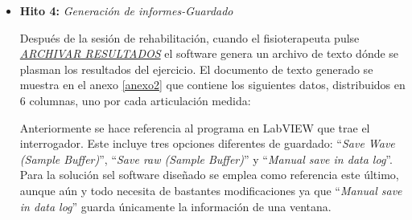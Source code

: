 \begin{itemize} [label=]
\begin{itemize} [label=]
		\item \underline{\textit{Bloque de visualización: }} El bloque de visualización está compuesto por dos ventanas: los indicadores del movimiento y la gráfica del espectro. Este último se utiliza como visualizador del comportamiento de las FBGs. Permite identificar en un rapido vistazo si el programa está funcionando correctamente. %
		
		Los indicadores del movimiento consisten en seis deslizadores, uno por cada FBG. Los indicadores están programados para que durante el paso de medición muestren entre el valor de reposo y el de los máximos de extensión y flexión en que posición se encuentra cada dedo (y muñeca). Cada uno de los dedos tiene su propio rango de movimiento.  
		
		Como se observa en la figura \ref{fig:interfazinicio} cada indicador tiene un rango que va desde el porcentaje de -120 hasta 120. Las lineas horizontales cortan los valores de -100, 0 y 100. Estos valores están relacionados proporcionalmente con el máximo de extensión (100), flexión (-100) y reposo (0).
		Por lo tanto, cuando se establecen los máximos de extensión y flexión del paciente, se está determinando la relación con la posición de reposo del 100\% y -100\% respectivamente.
		
		
		
		 	
	\end{itemize}
	
		
	\item \textbf{Hito 4:} \textit{Generación de informes-Guardado}
	
	Después de la sesión de rehabilitación, cuando el fisioterapeuta pulse \underline{\textit{ARCHIVAR RESULTADOS}} el software genera un archivo de texto dónde se plasman los resultados del ejercicio. El documento de texto generado se muestra en el anexo \ref{anexo2} que contiene los siguientes datos, distribuidos en 6 columnas, uno por cada articulación medida:
	

	Anteriormente se hace referencia al programa en LabVIEW que trae el interrogador. Este incluye tres opciones diferentes de guardado: ``\textit{Save Wave (Sample Buffer)}'', ``\textit{Save raw (Sample Buffer)}'' y ``\textit{Manual save in data log}''. Para la solución sel software diseñado se emplea como referencia este último, aunque aún y todo necesita de bastantes modificaciones ya que ``\textit{Manual save in data log}'' guarda únicamente la información de una ventana.
	

\end{itemize}
